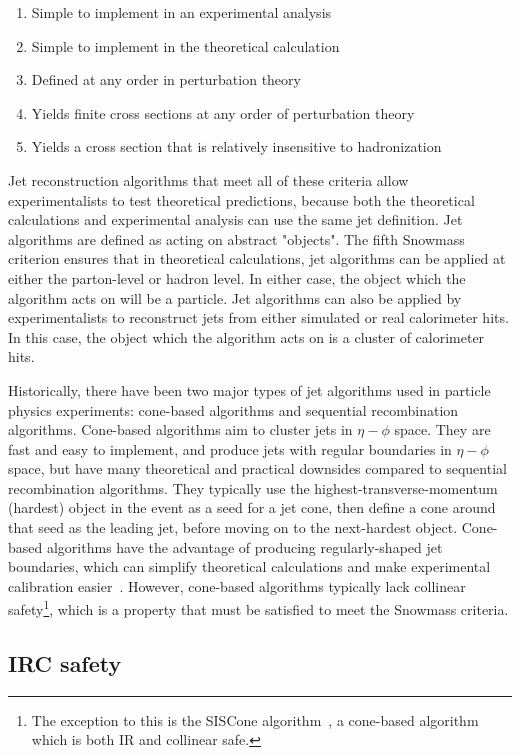 \begin{enumerate}
    \item Simple to implement in an experimental analysis
    \item Simple to implement in the theoretical calculation
    \item Defined at any order in perturbation theory
    \item Yields finite cross sections at any order of perturbation theory
    \item Yields a cross section that is relatively insensitive to hadronization
\end{enumerate}

Jet reconstruction algorithms that meet all of these criteria allow experimentalists to test theoretical predictions, because both the theoretical calculations and experimental analysis can use the same jet definition.
Jet algorithms are defined as acting on abstract "objects".
The fifth Snowmass criterion ensures that in theoretical calculations, jet algorithms can be applied at either the parton-level or hadron level.
In either case, the object which the algorithm acts on will be a particle.
Jet algorithms can also be applied by experimentalists to reconstruct jets from either simulated or real calorimeter hits.
In this case, the object which the algorithm acts on is a cluster of calorimeter hits.

Historically, there have been two major types of jet algorithms used in particle physics experiments: cone-based algorithms and sequential recombination algorithms.
Cone-based algorithms aim to cluster jets in $\eta-\phi$ space.
They are fast and easy to implement, and produce jets with regular boundaries in $\eta-\phi$ space, but have many theoretical and practical downsides compared to sequential recombination algorithms.
They typically use the highest-transverse-momentum (hardest) object in the event as a seed for a jet cone, then define a cone around that seed as the leading jet, before moving on to the next-hardest object.
Cone-based algorithms have the advantage of producing regularly-shaped jet boundaries, which can simplify theoretical calculations and make experimental calibration easier~\cite{jet-cone-algo}.
However, cone-based algorithms typically lack collinear safety\footnote{The exception to this is the SISCone algorithm~\cite{jet-siscone-algorithm}, a cone-based algorithm which is both IR and collinear safe.}, which is a property that must be satisfied to meet the Snowmass criteria.

\subsection{IRC safety}\label{subsec:jet_irc_safety}

